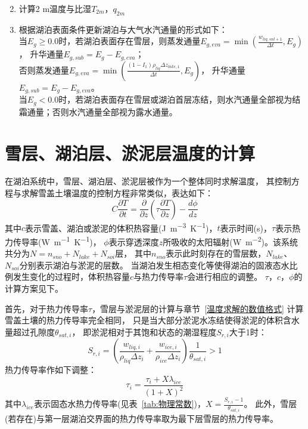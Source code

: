 \begin{enumerate}
\begin{equation}
    \end{equation}
    \item 计算2 m温度与比湿$T_{2m}$，$q_{2m}$
    \item 根据湖泊表面条件更新湖泊与大气水汽通量的形式如下：\\
    当$E_g\geqslant 0.0$时，若湖泊表面存在雪层，则蒸发通量$E_{g,eva}=\min \left(\frac{w_{liq, s n l+1}}{\Delta t}, E_{g}\right)$，
    升华通量$E_{g,sub}=E_{g}-E_{g,eva}$；\\
    否则蒸发通量$E_{g,eva}=\min \left(\frac{\left(1-I_{1}\right) \rho_{liq} \Delta z_{lake, 1}}{\Delta t}, E_{g}\right)$，
    升华通量$E_{g,sub}=E_{g}-E_{g,eva}$。\\
    当$E_g<0.0$时，若湖泊表面存在雪层或湖泊首层冻结，则水汽通量全部视为结霜通量；否则水汽通量全部视为露水通量。
    
\end{enumerate}

\section{雪层、湖泊层、淤泥层温度的计算}\label{雪层湖泊层淤泥层温度的计算}
在湖泊系统中，雪层、湖泊层、淤泥层被作为一个整体同时求解温度，
其控制方程与求解雪盖土壤温度的控制方程非常类似，表达如下：
\begin{equation}
C \frac{\partial T}{\partial t}=\frac{\partial}{\partial z}\left(\tau \frac{\partial T}{\partial z}\right)-\frac{d \phi}{d z}
\end{equation}
其中$c$表示雪盖、湖泊或淤泥的体积热容量(\unit{J.m^{-3}.K^{-1}})，$t$表示时间(s)，$\tau$表示热力传导率(\unit{W.m^{-1}.K^{-1}})，
$\phi$表示穿透深度$z$所吸收的太阳辐射(\unit{W.m^{-2}})。该系统共分为$N=n_{sno}+N_{lake}+N_{soi}$层，
其中$n_{sno}$表示此时刻存在的雪层数，$N_{lake}$、$N_{soi}$分别表示湖泊与淤泥的层数。
当湖泊发生相态变化等使得湖泊的固液态水比例发生变化的过程时，体积热容量$c$与热力传导率$\tau$会进行相应的调整。
$\tau$，$c$，$\phi$的计算方案见下。


首先，对于热力传导率$\tau$，雪层与淤泥层的计算与章节~\ref{温度求解的数值格式} 计算雪盖土壤的热力传导率完全相同，
只是当大部分淤泥水冻结使得淤泥的体积含水量超过孔隙度$\theta_{sat,i}$，
即淤泥相对于其饱和状态的潮湿程度$S_{r,i}$大于1时：
\begin{equation}
S_{r,i}=\left(\frac{w_{liq, i}}{\rho_{liq} \Delta z_{i}}+\frac{w_{ice, i}}{\rho_{ice} \Delta z_{i}}\right) 
\frac{1}{\theta_{sat,i}}>1
\end{equation}
热力传导率作如下调整：
\begin{equation}
\tau_{i}=\frac{\tau_{i}+X \lambda_{ice}}{(1+X)^{2}}
\end{equation}
其中$\lambda_{ice}$表示固态水热力传导率(见表~\ref{tab:物理常数})，$X=\frac{S_{r,i}-1}{\theta_{sat,i}}$。
此外，雪层(若存在)与第一层湖泊交界面的热力传导率取为最下层雪层的热力传导率。

